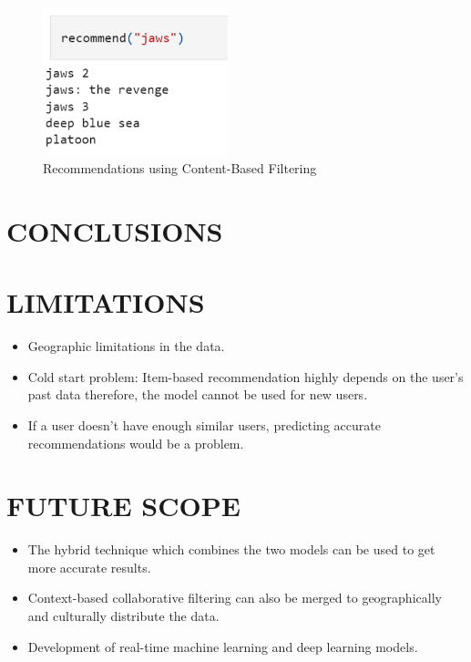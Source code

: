 \documentclass[a4paper,10pt]{article}
\begin{document}
\begin{itemize}
\begin{figure}[ht]
        
        \centering
        \includegraphics[height=4.3cm]{figures/recommend(content).png}
        \caption{Recommendations using Content-Based Filtering}
        \label{recommend(content)}
\end{figure}


\end{itemize}

\section{CONCLUSIONS}

\section{LIMITATIONS}
\begin{itemize}
    \item Geographic limitations in the data.
    \item Cold start problem: Item-based recommendation highly depends on the user’s past data therefore, the model cannot be used for new users.

    \item If a user doesn't have enough similar users, predicting accurate recommendations would be a problem.
\end{itemize}


\section{FUTURE SCOPE}
\begin{itemize}
    \item The hybrid technique which combines the two models can be used to get more accurate results.
    \item Context-based collaborative filtering can also be merged to geographically and culturally distribute the data.
    \item Development of real-time machine learning and deep learning models.
\end{itemize}
\fontsize{8}{9}\selectfont




\clearpage
\end{document}
